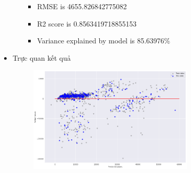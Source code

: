 \documentclass{article}
\begin{document}
\begin{itemize}
\begin{itemize}
\begin{itemize}
				\item RMSE is 4655.826842775082
				\item R2 score is 0.8563419718855153
				\item Variance explained by model is 85.63976\%
			\end{itemize}
		\end{itemize}
		\item Trực quan kết quả
		\begin{figure}[H]
			\centering
			\includegraphics[width=0.75\textwidth]{images/polynomial_reg/poly_reg_plot.png}
		\end{figure}
	\end{itemize}
\end{document}
